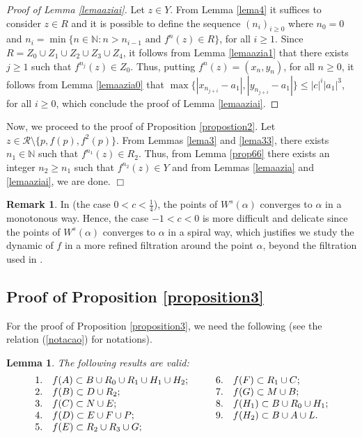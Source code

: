 \documentclass[11pt]{amsart}
\newtheorem{lemma}[theorem]{Lemma}
\theoremstyle{definition}
\newtheorem{remark}{Remark}
\begin{document}
\begin{proof}[Proof of Lemma  \ref{lemaaziai}] Let $z\in Y$. From Lemma \ref{lema4} it suffices to consider $z\in R$ and it is possible to define the sequence $(n_i)_{i\geq 0}$ where $n_0=0$ and $n_i=\min\{n\in\mathbb{N}: n>{n_{i-1}} \textrm{ and } f^n(z)\in R\}$, for all $i\geq 1$. Since $R=Z_0\cup Z_1\cup Z_2\cup Z_3\cup Z_4$, it follows from Lemma \ref{lemaazia1} that there exists $j\geq 1$ such that $f^{n_j}(z)\in Z_0$. Thus, putting $f^n(z)=(x_n,y_n)$, for all $n\geq 0$, it follows from Lemma \ref{lemaazia0} that $\max\{|x_{n_{j+i}}-a_1|,|y_{n_{j+i}}-a_1|\}\leq |c|^i|a_1|^3$, for all $i \geq 0$, which conclude the proof of Lemma  \ref{lemaaziai}.
\end{proof}

Now, we proceed to the proof of Proposition \ref{propostion2}. Let $z\in\mathcal{R}\setminus \{p,f(p),f^2(p)\}$. From Lemmas \ref{lema3} and \ref{lema33}, there exists $n_1\in \mathbb{N}$ such that $f^{n_1}(z)\in R_2$. Thus, from Lemma \ref{prop66} there exists an integer $n_2\geq n_1$ such that $f^{n_2}(z)\in Y$ and from Lemmas \ref{lemaazia} and \ref{lemaaziai}, we are done. \hfill $\Box$

\begin{remark}
In \cite{bcm} (the case $0< c<\frac{1}{4}$), the points of $W^s(\alpha)$ converges to $\alpha$ in a  monotonous way. Hence, the case $-1<c<0$ is more difficult and delicate since the points of $W^s(\alpha)$ converges to $\alpha$ in a spiral way, which justifies we study the dynamic of $f$ in a more refined filtration around the point $\alpha$, beyond the filtration used in \cite{bcm}.
\end{remark}

\subsection{Proof of Proposition \ref{proposition3}} \label{subsecwstheta} For the proof of Proposition \ref{proposition3}, we need the following (see the relation (\ref{notacao}) for notations).

\begin{lemma}
	The following results are valid:
$$
\begin{array}{lllll}
1. & f(A)\subset B\cup R_0\cup R_1\cup H_1\cup H_2; & \hspace{.3cm} & 6. & f(F)\subset R_1\cup C; \\
2. & f(B)\subset D\cup R_2;                         &               & 7. & f(G)\subset M\cup B; \\
3. & f(C)\subset N\cup E;                           &               & 8. & f(H_1)\subset B\cup R_0\cup H_1; \\
4. & f(D)\subset E\cup F\cup P;                     &               & 9. & f(H_2)\subset B\cup A\cup L. \\
5. & f(E)\subset R_2\cup R_3\cup G;                 &               &    &
\end{array}$$ \label{lema314}	
\end{lemma}
\end{document}
